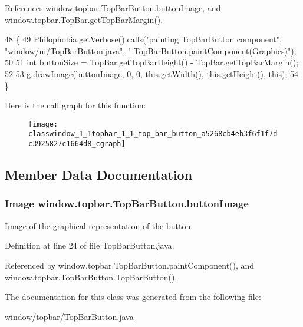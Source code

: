 References window.\-topbar.\-Top\-Bar\-Button.\-button\-Image, and window.\-topbar.\-Top\-Bar.\-get\-Top\-Bar\-Margin().


\begin{DoxyCode}
48                                            \{
49         Philophobia.getVerbose().calls(\textcolor{stringliteral}{"painting TopBarButton component"}, \textcolor{stringliteral}{"window/ui/TopBarButton.java"}, \textcolor{stringliteral}{"
      TopBarButton.paintComponent(Graphics)"});
50 
51         \textcolor{keywordtype}{int} buttonSize = TopBar.getTopBarHeight() - TopBar.getTopBarMargin();
52 
53         g.drawImage(\hyperlink{classwindow_1_1topbar_1_1_top_bar_button_a2a050ade4f03c9c48f1d338e88b9e21c}{buttonImage}, 0, 0, this.getWidth(), this.getHeight(), \textcolor{keyword}{this});
54     \}
\end{DoxyCode}


Here is the call graph for this function\-:
\nopagebreak
\begin{figure}[H]
\begin{center}
\leavevmode
\texttt{[image: classwindow\_1\_1topbar\_1\_1\_top\_bar\_button\_a5268cb4eb3f6f1f7dc3925827c1664d8\_cgraph]}
\end{center}
\end{figure}




\subsection{Member Data Documentation}
\hypertarget{classwindow_1_1topbar_1_1_top_bar_button_a2a050ade4f03c9c48f1d338e88b9e21c}{
\subsubsection[{button\-Image}]{\setlength{\rightskip}{0pt plus 5cm}Image window.\-topbar.\-Top\-Bar\-Button.\-button\-Image\hspace{0.3cm}{\ttfamily [protected]}}}\label{classwindow_1_1topbar_1_1_top_bar_button_a2a050ade4f03c9c48f1d338e88b9e21c}


Image of the graphical representation of the button. 



Definition at line 24 of file Top\-Bar\-Button.\-java.



Referenced by window.\-topbar.\-Top\-Bar\-Button.\-paint\-Component(), and window.\-topbar.\-Top\-Bar\-Button.\-Top\-Bar\-Button().



The documentation for this class was generated from the following file\-:\begin{DoxyCompactItemize}
\item 
window/topbar/\hyperlink{_top_bar_button_8java}{Top\-Bar\-Button.\-java}\end{DoxyCompactItemize}
